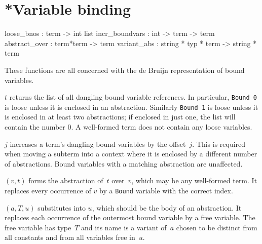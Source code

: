 \section{*Variable binding}
\begin{ttbox}
loose_bnos     : term -> int list
incr_boundvars : int -> term -> term
abstract_over  : term*term -> term
variant_abs    : string * typ * term -> string * term
\end{ttbox}
These functions are all concerned with the de Bruijn representation of
bound variables.
\begin{ttdescription}
\item[\ttindexbold{loose_bnos} $t$]
  returns the list of all dangling bound variable references.  In
  particular, \texttt{Bound~0} is loose unless it is enclosed in an
  abstraction.  Similarly \texttt{Bound~1} is loose unless it is enclosed in
  at least two abstractions; if enclosed in just one, the list will contain
  the number 0.  A well-formed term does not contain any loose variables.

\item[\ttindexbold{incr_boundvars} $j$]
  increases a term's dangling bound variables by the offset~$j$.  This is
  required when moving a subterm into a context where it is enclosed by a
  different number of abstractions.  Bound variables with a matching
  abstraction are unaffected.

\item[\ttindexbold{abstract_over} $(v,t)$]
  forms the abstraction of~$t$ over~$v$, which may be any well-formed term.
  It replaces every occurrence of \(v\) by a \texttt{Bound} variable with the
  correct index.

\item[\ttindexbold{variant_abs} $(a,T,u)$]
  substitutes into $u$, which should be the body of an abstraction.
  It replaces each occurrence of the outermost bound variable by a free
  variable.  The free variable has type~$T$ and its name is a variant
  of~$a$ chosen to be distinct from all constants and from all variables
  free in~$u$.

\end{ttdescription}



